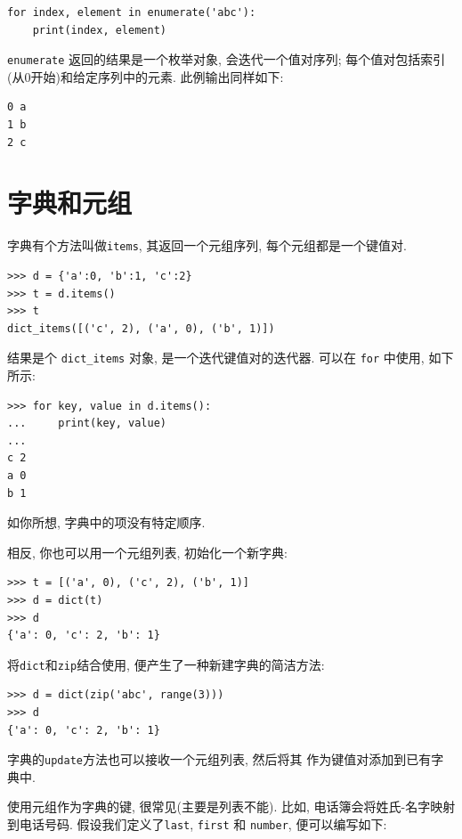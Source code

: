 \documentclass[10pt]{book}
\begin{document}
\begin{verbatim}
for index, element in enumerate('abc'):
    print(index, element)
\end{verbatim}
%
 {\tt enumerate} 返回的结果是一个枚举对象, 
会迭代一个值对序列;
每个值对包括索引(从0开始)和给定序列中的元素. 
此例输出同样如下:

\begin{verbatim}
0 a
1 b
2 c
\end{verbatim}
%


\section{字典和元组}
\label{dictuple}

字典有个方法叫做{\tt items}, 其返回一个元组序列, 每个元组都是一个键值对.

\begin{verbatim}
>>> d = {'a':0, 'b':1, 'c':2}
>>> t = d.items()
>>> t
dict_items([('c', 2), ('a', 0), ('b', 1)])
\end{verbatim}
%
结果是个 \verb"dict_items" 对象, 是一个迭代键值对的迭代器. 
可以在 {\tt for} 中使用, 如下所示:

\begin{verbatim}
>>> for key, value in d.items():
...     print(key, value)
...
c 2
a 0
b 1
\end{verbatim}
%
如你所想, 字典中的项没有特定顺序. 

相反, 你也可以用一个元组列表, 初始化一个新字典: 

\begin{verbatim}
>>> t = [('a', 0), ('c', 2), ('b', 1)]
>>> d = dict(t)
>>> d
{'a': 0, 'c': 2, 'b': 1}
\end{verbatim}

将{\tt dict}和{\tt zip}结合使用, 便产生了一种新建字典的简洁方法:

\begin{verbatim}
>>> d = dict(zip('abc', range(3)))
>>> d
{'a': 0, 'c': 2, 'b': 1}
\end{verbatim}
%
字典的{\tt update}方法也可以接收一个元组列表, 然后将其
作为键值对添加到已有字典中.

使用元组作为字典的键, 很常见(主要是列表不能). 
比如, 电话簿会将姓氏-名字映射到电话号码. 
假设我们定义了{\tt last}, {\tt first} 和 {\tt number}, 
便可以编写如下:
\end{document}
